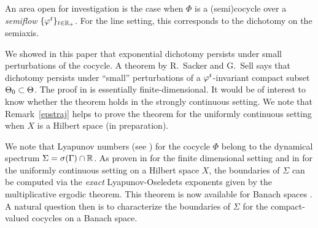 \begin{rem}\label{semiaxis} An area open for investigation
is the case when $\Phi$ is a (semi)cocycle over a {\it semiflow}
$\{\varphi^t\}_{t\in{\Bbb{R}}_+}$. For the line setting, this
corresponds to the dichotomy on the semiaxis.
\end{rem}

\begin{rem}\label{stabil} We showed in this paper that
exponential dichotomy persists under small perturbations of the
cocycle. A theorem by R.~Sacker and G.~Sell \cite[Thm. 6]{SSSpT}
says that dichotomy persists under ``small'' perturbations of a
$\varphi^t$-invariant compact subset $\Theta_0\subset \Theta$. The proof in
\cite{SSSpT} is essentially finite-dimensional. It would be of
interest to know whether the theorem holds in the strongly continuous
setting.  We note that Remark~\ref{epstraj} helps to prove the
theorem for the uniformly continuous setting when $X$ is a
Hilbert space (in preparation).
\end{rem}

\begin{rem}\label{Oseledets} We note that Lyapunov numbers
(see \cite{ChLe1,JPS,SSSpT}) for the cocycle $\Phi$ belong to the
dynamical spectrum $\Sigma=\sigma(\Gamma)\cap{\Bbb{R}}$. As proven
in \cite{JPS} for the finite dimensional setting and in \cite{LS}
for the uniformly continuous setting on a Hilbert space $X$, the
boundaries of $\Sigma$ can be computed via the {\it exact}
Lyapunov-Oseledets exponents given by
the multiplicative ergodic theorem. This theorem is now available
for Banach spaces \cite{Mane}. A natural question then is to
characterize the boundaries of $\Sigma$ for the compact-valued
cocycles on a Banach space.
\end{rem}

